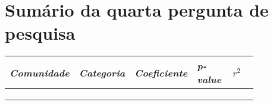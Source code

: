 \chapter{Sumário da quarta pergunta de pesquisa}
\label{app:q4}

\small
\begin{longtabu}{@{}
	p{0.2\linewidth}
	p{0.2\linewidth}
	P{0.15\linewidth}
	P{0.15\linewidth}
	P{0.13\linewidth}@{}}
\toprule
\textit{Comunidade}        & \textit{Categoria}    & \textit{Coeficiente} & \textit{p-value} & $r^2$ \\ \midrule
\endhead

\\ \hline
\endfoot

\\
\endlastfoot


\end{longtabu}
